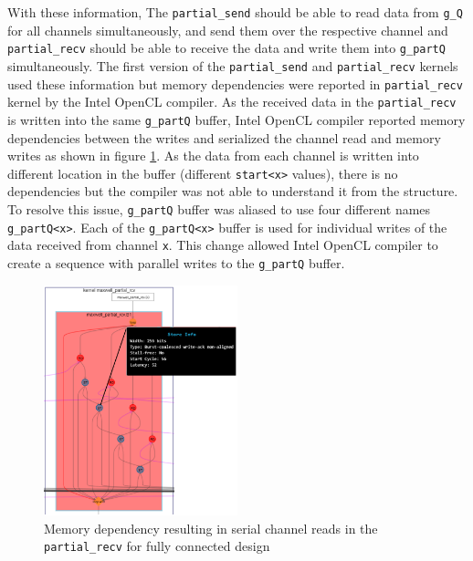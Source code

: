 With these information, The \texttt{partial\_send} should be able to read data from \texttt{g\_Q}
for all channels simultaneously, and send them over the respective channel and \texttt{partial\_recv}
should be able to receive the data and write them into \texttt{g_partQ} simultaneously. The first
version of the \texttt{partial\_send} and \texttt{partial\_recv} kernels used these information
but memory dependencies were reported in \texttt{partial\_recv} kernel by the Intel OpenCL compiler.
As the received data in the \texttt{partial\_recv} is written into the same \texttt{g\_partQ} buffer,
Intel OpenCL compiler reported memory dependencies between the writes and serialized the channel
read and memory writes as shown in figure \ref{fig:serial_reads}. As the data from each channel is written
into different location in the buffer (different \texttt{start<x>} values), there is no
dependencies but the compiler was not able to understand it from the structure.
To resolve this issue, \texttt{g\_partQ} buffer was aliased to use four
different names \texttt{g\_partQ<x>}. Each of the \texttt{g\_partQ<x>} buffer is used
for individual writes of the data received from channel \texttt{x}. This change allowed
Intel OpenCL compiler to create a sequence with parallel writes to the \texttt{g\_partQ} buffer.
\begin{figure}[ht]%
    \centering
    \includegraphics[width=0.5\textwidth]{images/serial_reads}
    \caption{Memory dependency resulting in serial channel reads in the \texttt{partial\_recv}
    for fully connected design}
    \label{fig:serial_reads}
\end{figure}


